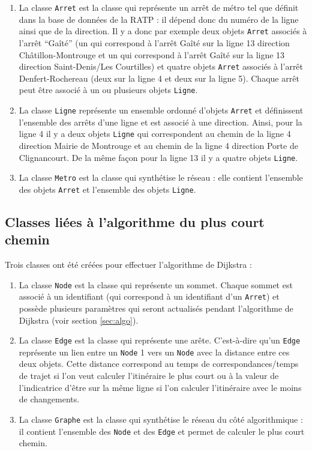 \documentclass[,french]{article}
\begin{document}
\begin{enumerate}
\def\labelenumi{\arabic{enumi}.}
\item
  La classe \texttt{Arret} est la classe qui représente un arrêt de
  métro tel que définit dans la base de données de la RATP : il dépend
  donc du numéro de la ligne ainsi que de la direction. Il y a donc par
  exemple deux objets \texttt{Arret} associés à l'arrêt ``Gaîté'' (un
  qui correspond à l'arrêt Gaîté sur la ligne 13 direction
  Châtillon-Montrouge et un qui correspond à l'arrêt Gaîté sur la ligne
  13 direction Saint-Denis/Les Courtilles) et quatre objets
  \texttt{Arret} associés à l'arrêt Denfert-Rochereau (deux sur la ligne
  4 et deux sur la ligne 5). Chaque arrêt peut être associé à un ou
  plusieurs objets \texttt{Ligne}.
\item
  La classe \texttt{Ligne} représente un ensemble ordonné d'objets
  \texttt{Arret} et définissent l'ensemble des arrêts d'une ligne et est
  associé à une direction. Ainsi, pour la ligne 4 il y a deux objets
  \texttt{Ligne} qui correspondent au chemin de la ligne 4 direction
  Mairie de Montrouge et au chemin de la ligne 4 direction Porte de
  Clignancourt. De la même façon pour la ligne 13 il y a quatre objets
  \texttt{Ligne}.
\item
  La classe \texttt{Metro} est la classe qui synthétise le réseau : elle
  contient l'ensemble des objets \texttt{Arret} et l'ensemble des objets
  \texttt{Ligne}.
\end{enumerate}

\hypertarget{classes-liuxe9es-uxe0-lalgorithme-du-plus-court-chemin}{%
\subsection{Classes liées à l'algorithme du plus court
chemin}\label{classes-liuxe9es-uxe0-lalgorithme-du-plus-court-chemin}}

Trois classes ont été créées pour effectuer l'algorithme de Dijkstra :

\begin{enumerate}
\def\labelenumi{\arabic{enumi}.}
\item
  La classe \texttt{Node} est la classe qui représente un sommet. Chaque
  sommet est associé à un identifiant (qui correspond à un identifiant
  d'un \texttt{Arret}) et possède plusieurs paramètres qui seront
  actualisés pendant l'algorithme de Dijkstra (voir section
  \ref{sec:algo}).
\item
  La classe \texttt{Edge} est la classe qui représente une arête.
  C'est-à-dire qu'un \texttt{Edge} représente un lien entre un
  \texttt{Node} 1 vers un \texttt{Node} avec la distance entre ces deux
  objets. Cette distance correspond au temps de correspondances/temps de
  trajet si l'on veut calculer l'itinéraire le plus court ou à la valeur
  de l'indicatrice d'être sur la même ligne si l'on calculer
  l'itinéraire avec le moins de changements.
\item
  La classe \texttt{Graphe} est la classe qui synthétise le réseau du
  côté algorithmique : il contient l'ensemble des \texttt{Node} et des
  \texttt{Edge} et permet de calculer le plus court chemin.
\end{enumerate}
\end{document}
